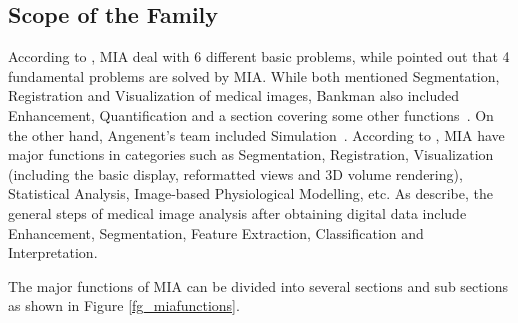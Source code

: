\documentclass[12pt]{article}
\newcommand{\famname}{MIA} %
\begin{document}
\subsection{Scope of the Family} 

According to \cite{Bankman2000}, \famname{} deal with 6 different basic problems, while \cite{Angenent2006} pointed out that 4 fundamental problems are solved by \famname. While both mentioned Segmentation, Registration and Visualization of medical images, Bankman also included Enhancement, Quantification and a section covering some other functions~\cite{Bankman2000}. On the other hand, Angenent's team included Simulation~\cite{Angenent2006}. According to \cite{wiki:001}, \famname{} have major functions in categories such as Segmentation, Registration, Visualization (including the basic display, reformatted views and 3D volume rendering), Statistical Analysis, Image-based Physiological Modelling, etc. As \cite{Kim2011} describe, the general steps of medical image analysis after obtaining digital data include Enhancement, Segmentation, Feature Extraction, Classification and Interpretation.

The major functions of \famname{} can be divided into several sections and sub sections as shown in Figure \ref{fg_miafunctions}.

\begin{center}
\captionof{figure}{Major functions of \famname}
\label{fg_miafunctions}
\end{center}
\end{document}

